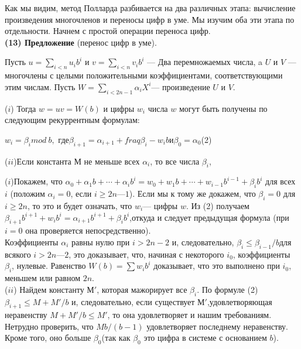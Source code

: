 Как мы видим, метод Полларда разбивается на два различных этапа: вычисление произведения многочленов и переносы цифр в уме. Мы изучим оба эти этапа по отдельности. Начнем с простой операции переноса цифр. \\
\textbf{(13) Предложение} (перенос цифр в уме).\par
  Пусть $u = \sum_{i<n}u_{i}b^{i}$ и $v = \sum_{i < n}v_{i}b^{i}$ --- Два перемножаемых числа, a $U$ и $V$ — многочлены с целыми положительными коэффициентами, соответствующими этим числам. Пусть $W =\sum_{i<2n-1} \alpha_{i}X^{i}$--- произведение $U$ и $V$.\par
 ($i$) Тогда $w = uv = W(b)$ и цифры $w_{i}$ числа $w$ могут быть получены
по следующим рекуррентным формулам: 
\begin{center}
$w_{i} = \beta_{i}mod\ b, $ \quad где\quad $\beta_{i+1} = \alpha_{i+1} + fraq{\beta_{i}-w_{i}}{b}$\enskip и\enskip $\beta_0 = \alpha_{0}$\quad (2)
\end{center}
\pagebreak
\newpage


($ii$)Если константа М не меньше всех $\alpha_{i}$, то все числа $\beta_{i}$,

\begin{myproof}
($i$)Покажем, что $\alpha_0 + \alpha_{1}b + \cdots + \alpha_{i}b^{i} = w_{0} + w_{1}b + \cdots + w_{i-1}b^{i-1}+ \beta_{i}b^{i}$
для всех $i$ (положим $\alpha_{i} = 0$, если $ i \geq 2n — 1$). Если мы к тому же докажем, что $\beta_{i} = 0$ для $i \geq 2n$, то это и будет означать, что $w_{i}$--- цифры $w$. Из (2) получаем $\beta_{i+1}b^{i+1} + w_{i}b^{i} = \alpha_{i+1}b^{i+1} + \beta_{i}b^{i}$,откуда и следует предыдущая формула (при $i = 0$ она проверяется непосредственно). \\ 
Коэффициенты $\alpha_{i}$ равны нулю при $i > 2n - 2$ и, следовательно,
$\beta_{i} \leq \beta_{i-1}/b$для всякого $i > 2n — 2$, это доказывает, что, начиная с некоторого $i_{0}$, коэффициенты $\beta_{i}$, нулевые. Равенство $W(b) =\sum w_{i}b^{i}$ доказывает, что это выполнено при $i_0$, меньшем или равном $2n$. \\
($ii$) Найдем константу $М'$, которая мажорирует все $\beta_{i}$. По 
формуле (2) $\beta_{i+1} \leq M + M'/b$ и, следовательно, если существует $М'$,удовлетворяющая неравенству $M + M'/b \leq M'$, то она 
удовлетворяет и нашим требованиям. Нетрудно проверить, что $Mb/(b-1)$ удовлетворяет последнему неравенству. Кроме того, оно больше $\beta_{0}$(так как $\beta_{0}$ это цифра в системе с основанием $b$). 
\end{myproof}

